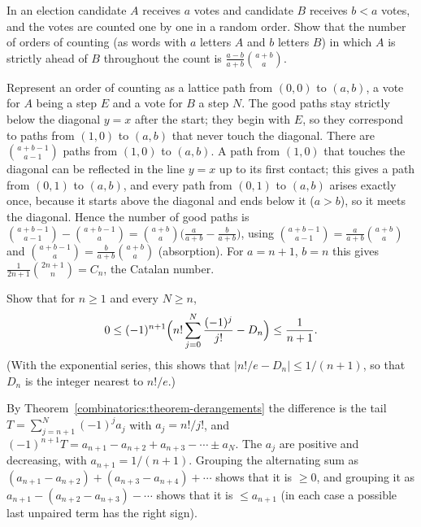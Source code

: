 \begin{exercise}\label{combinatorics:exercise-ballot}
In an election candidate $A$ receives $a$ votes and candidate $B$ receives $b < a$ votes, and the votes are counted one by one in a random order. Show that the number of orders of counting (as
words with $a$ letters $A$ and $b$ letters $B$) in which $A$ is strictly ahead of $B$ throughout the count is $\frac{a - b}{a + b}\binom{a + b}{a}$.
\end{exercise}

\begin{solution}
Represent an order of counting as a lattice path from $(0, 0)$ to $(a, b)$, a vote for $A$ being a step $E$ and a vote for $B$ a step $N$. The good paths stay strictly below the diagonal $y = x$ after
the start; they begin with $E$, so they correspond to paths from $(1, 0)$ to $(a, b)$ that never touch the diagonal. There are $\binom{a + b - 1}{a - 1}$ paths from $(1, 0)$ to $(a, b)$. A path from
$(1, 0)$ that touches the diagonal can be reflected in the line $y = x$ up to its first contact; this gives a path from $(0, 1)$ to $(a, b)$, and every path from $(0, 1)$ to $(a, b)$ arises exactly once,
because it starts above the diagonal and ends below it ($a > b$), so it meets the diagonal. Hence the number of good paths is
$\binom{a+b-1}{a-1} - \binom{a+b-1}{a} = \binom{a+b}{a}\bigl(\frac{a}{a+b} - \frac{b}{a+b}\bigr)$, using $\binom{a+b-1}{a-1} = \frac{a}{a+b}\binom{a+b}{a}$ and
$\binom{a+b-1}{a} = \frac{b}{a+b}\binom{a+b}{a}$ (absorption). For $a = n + 1$, $b = n$ this gives $\frac{1}{2n+1}\binom{2n+1}{n} = C_n$, the Catalan number.
\end{solution}

\begin{exercise}\label{combinatorics:exercise-derangements-nearest}
Show that for $n \geq 1$ and every $N \geq n$,
\[
0 \leq (-1)^{n+1}\Bigl(n!\sum_{j=0}^{N}\frac{(-1)^j}{j!} - D_n\Bigr) \leq \frac{1}{n + 1}.
\]
(With the exponential series, this shows that $|n!/e - D_n| \leq 1/(n + 1)$, so that $D_n$ is the integer nearest to $n!/e$.)
\end{exercise}

\begin{solution}
By Theorem~\ref{combinatorics:theorem-derangements} the difference is the tail $T = \sum_{j=n+1}^{N}(-1)^ja_j$ with $a_j = n!/j!$, and $(-1)^{n+1}T = a_{n+1} - a_{n+2} + a_{n+3} - \cdots \pm a_N$.
The $a_j$ are positive and decreasing, with $a_{n+1} = 1/(n + 1)$. Grouping the alternating sum as $(a_{n+1} - a_{n+2}) + (a_{n+3} - a_{n+4}) + \cdots$ shows that it is $\geq 0$, and grouping it as
$a_{n+1} - (a_{n+2} - a_{n+3}) - \cdots$ shows that it is $\leq a_{n+1}$ (in each case a possible last unpaired term has the right sign).
\end{solution}

